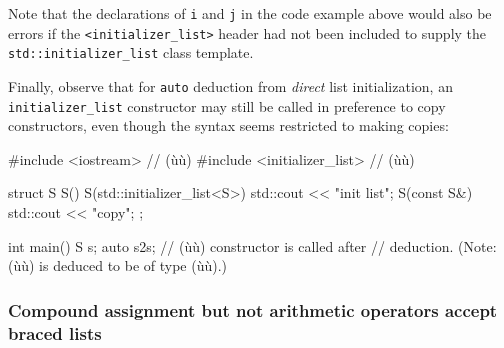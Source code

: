 \noindent Note that the declarations of \lstinline!i! and \lstinline!j! in the code
example above would also be errors if the \lstinline!<initializer_list>!
header had not been included to supply the
\lstinline!std::initializer_list! class template.

Finally, observe that for \lstinline!auto! deduction from \emph{direct}
list initialization, an \lstinline!initializer_list! constructor may still
be called in preference to copy constructors, even though the syntax
seems restricted to making copies:

\begin{emcppslisting}
#include <iostream>          // (ù{}ù)
#include <initializer_list>  // (ù{}ù)

struct S
{
    S() { }
    S(std::initializer_list<S>) { std::cout << "init list\n";}
    S(const S&) { std::cout << "copy\n";}
};

int main()
{
    S s;
    auto s2{s};  // (ù{}ù) constructor is called after
                 // deduction. (Note: (ù{}ù) is deduced to be of type (ù{}ù).)
}
\end{emcppslisting}
    

\subsubsection[Compound assignment but not arithmetic operators accept braced lists]{Compound assignment but not arithmetic operators accept braced lists}\label{compound-assignment-but-not-arithmetic-operators-accept-braced-lists}

